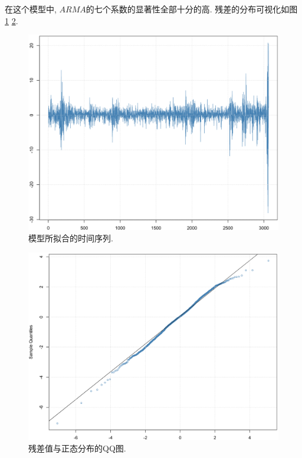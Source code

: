 \documentclass[11pt]{article}
\begin{document}
\qquad 在这个模型中, $ARMA$的七个系数的显著性全部十分的高. 残差的分布可视化如图 \ref{fig:17} \ref{fig:18}.
\begin{center}
    \hspace{30pt}\begin{minipage}{0.45\textwidth}
        \begin{figure}
            \centering
            \hspace{-25pt}\includegraphics[width=.9\textwidth]{output_52_0}
            \caption{模型所拟合的时间序列.\label{fig:17}}
        \end{figure}
    \end{minipage}
    \begin{minipage}{0.45\textwidth}
        \begin{figure}
            \centering
            \hspace{-25pt}\includegraphics[width=.9\textwidth]{output_53_0}
            \caption{残差值与正态分布的QQ图.\label{fig:18}}
        \end{figure}
    \end{minipage}
\end{center}
\end{document}
